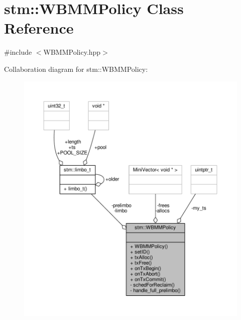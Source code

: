 \hypertarget{classstm_1_1WBMMPolicy}{\section{stm\-:\-:W\-B\-M\-M\-Policy Class Reference}
\label{classstm_1_1WBMMPolicy}
}


{\ttfamily \#include $<$W\-B\-M\-M\-Policy.\-hpp$>$}



Collaboration diagram for stm\-:\-:W\-B\-M\-M\-Policy\-:
\nopagebreak
\begin{figure}[H]
\begin{center}
\leavevmode
\includegraphics[width=350pt]{classstm_1_1WBMMPolicy__coll__graph}
\end{center}
\end{figure}
